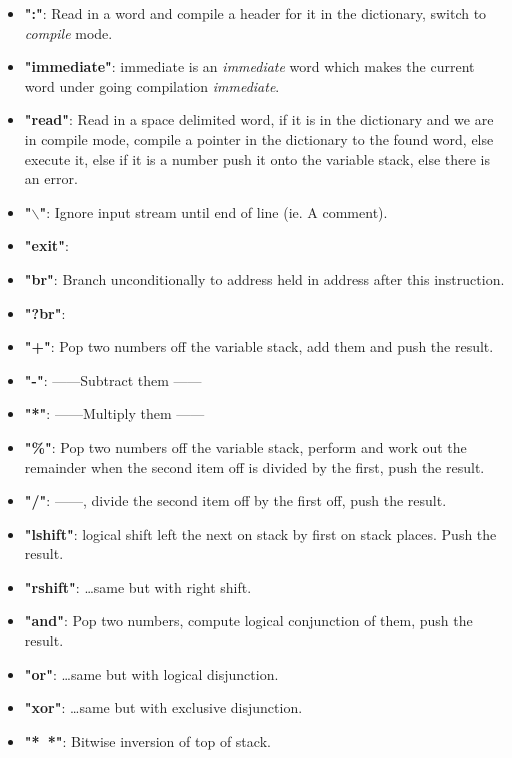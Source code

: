 \documentclass	[a4paper, 10pt]	{article}
\newcommand*{\ditto}{---\textquotedbl---}
\begin{document}
      \begin{itemize}
        \item \textbf{":"}: Read in a word and compile a header for it in the
        dictionary, switch to \emph{compile} mode.
        \item \textbf{"immediate"}: immediate is an \emph{immediate} word which
        makes the current word under going compilation \emph{immediate}.
        \item \textbf{"read"}: Read in a space delimited word, if it is in the
        dictionary and we are in compile mode, compile a pointer in the dictionary
        to the found word, else execute it, else if it is a number push it onto
        the variable stack, else there is an error.
        \item \textbf{"$\backslash$"}: Ignore input stream until end of line 
        (ie. A comment).
        \item \textbf{"exit"}:
        \item \textbf{"br"}: Branch unconditionally to address held in address
        after this instruction.
        \item \textbf{"?br"}: 
        \item \textbf{"+"}: Pop two numbers off the variable stack, add them
        and push the result.
        \item \textbf{"-"}: \ditto Subtract them \ditto 
        \item \textbf{"*"}: \ditto Multiply them \ditto
        \item \textbf{"\%"}: Pop two numbers off the variable stack, perform
        and work out the remainder when the second item off is divided by
        the first, push the result.
        \item \textbf{"/"}: \ditto, divide the second item off by the first
        off, push the result.
        \item \textbf{"lshift"}: logical shift left the next on stack by
        first on stack places. Push the result.
        \item \textbf{"rshift"}: \ldots same but with right shift.
        \item \textbf{"and"}: Pop two numbers, compute logical conjunction of them,
        push the result.
        \item \textbf{"or"}: \ldots same but with logical disjunction.
        \item \textbf{"xor"}: \ldots same but with exclusive disjunction.
        \item \textbf{"*~*"}: Bitwise inversion of top of stack.

\end{itemize}
\end{document}
